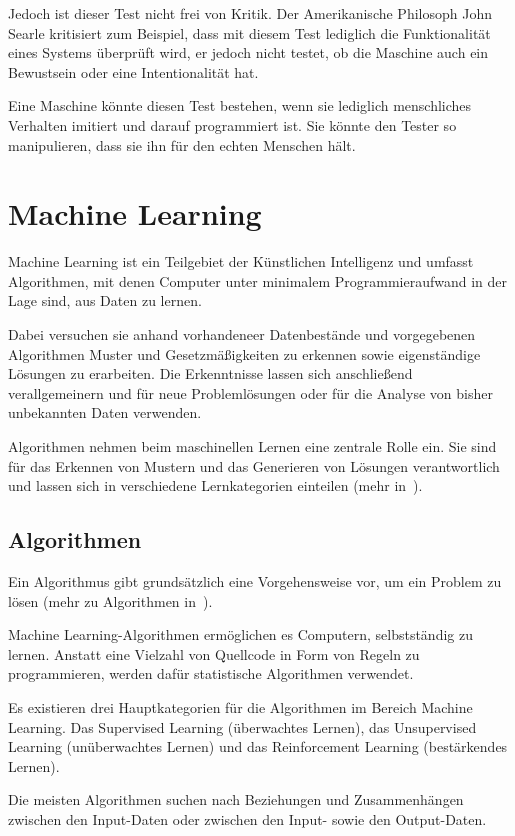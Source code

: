 Jedoch ist dieser Test nicht frei von Kritik. Der Amerikanische Philosoph John Searle kritisiert zum Beispiel, dass mit
diesem Test lediglich die Funktionalität eines Systems überprüft wird, er jedoch nicht testet, ob die Maschine auch ein
Bewustsein oder eine Intentionalität hat.

Eine Maschine könnte diesen Test bestehen, wenn sie lediglich menschliches Verhalten imitiert und darauf programmiert
ist. Sie könnte den Tester so manipulieren, dass sie ihn für den echten Menschen hält.

\section{Machine Learning}
Machine Learning ist ein Teilgebiet der Künstlichen Intelligenz und umfasst Algorithmen, mit denen Computer unter
minimalem Programmieraufwand in der Lage sind, aus Daten zu lernen.

Dabei versuchen sie anhand vorhandeneer Datenbestände und vorgegebenen Algorithmen Muster und Gesetzmäßigkeiten zu
erkennen sowie eigenständige Lösungen zu erarbeiten. Die Erkenntnisse lassen sich anschließend verallgemeinern und für
neue Problemlösungen oder für die Analyse von bisher unbekannten Daten verwenden.

Algorithmen nehmen beim maschinellen Lernen eine zentrale Rolle ein. Sie sind für das Erkennen von Mustern und das
Generieren von Lösungen verantwortlich und lassen sich in verschiedene Lernkategorien einteilen
(mehr in~\cite{book_grundlagen_machinelearning}).

\subsection{Algorithmen}
Ein Algorithmus gibt grundsätzlich eine Vorgehensweise vor, um ein Problem zu lösen (mehr zu Algorithmen
in~\cite{book_grundlagen_algorithmen}).

Machine Learning-Algorithmen ermöglichen es Computern, selbstständig zu lernen. Anstatt eine Vielzahl von Quellcode in
Form von Regeln zu programmieren, werden dafür statistische Algorithmen verwendet.

Es existieren drei Hauptkategorien für die Algorithmen im Bereich Machine Learning. Das Supervised Learning (überwachtes
Lernen), das Unsupervised Learning (unüberwachtes Lernen) und das Reinforcement Learning (bestärkendes Lernen).

Die meisten Algorithmen suchen nach Beziehungen und Zusammenhängen zwischen den Input-Daten oder zwischen den Input-
sowie den Output-Daten.

